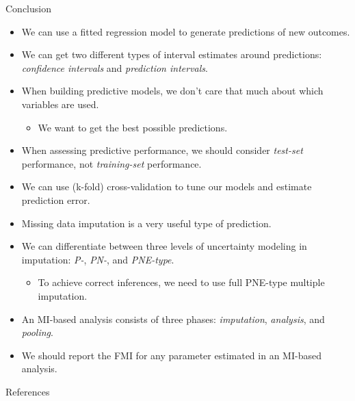 \documentclass{beamer}\usepackage[]{graphicx}\usepackage[]{color}
\begin{document}
\begin{frame}[allowframebreaks]{Conclusion}
  
  \begin{itemize}
  \item We can use a fitted regression model to generate predictions of new 
    outcomes.
    \vc
  \item We can get two different types of interval estimates around predictions: 
    \emph{confidence intervals} and \emph{prediction intervals}.
    \vc
  \item When building predictive models, we don't care that much about which 
    variables are used.
    \begin{itemize}
    \item We want to get the best possible predictions.
    \end{itemize}
    \vc
  \item When assessing predictive performance, we should consider 
    \emph{test-set} performance, not \emph{training-set} performance.
    \vc
  \item We can use (k-fold) cross-validation to tune our models and estimate 
    prediction error.
    
    \pagebreak
    
  \item Missing data imputation is a very useful type of prediction.
    \vc
  \item We can differentiate between three levels of uncertainty modeling in 
    imputation: \emph{P-}, \emph{PN-}, and \emph{PNE-type}.
    \begin{itemize}
    \item To achieve correct inferences, we need to use full PNE-type multiple 
      imputation.
    \end{itemize}
    \vc
  \item An MI-based analysis consists of three phases: \emph{imputation}, 
    \emph{analysis}, and \emph{pooling}.
    \vc
  \item We should report the FMI for any parameter estimated in an MI-based 
    analysis.
  \end{itemize}
  
\end{frame}


\begin{frame}[allowframebreaks]{References}
  
  
  
  
\end{frame}

\end{document}
